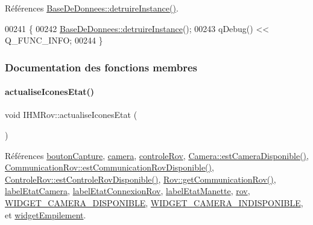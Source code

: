 Références \hyperlink{class_base_de_donnees_a457401c0816b888c77ce915997545f4e}{Base\+De\+Donnees\+::detruire\+Instance()}.


\begin{DoxyCode}
00241 \{
00242     \hyperlink{class_base_de_donnees_a457401c0816b888c77ce915997545f4e}{BaseDeDonnees::detruireInstance}();
00243     qDebug() << Q\_FUNC\_INFO;
00244 \}
\end{DoxyCode}


\subsubsection{Documentation des fonctions membres}
\mbox{\label{class_i_h_m_rov_abbfcdc154a6ae7f941d186f6c90a5a2b}} 
\paragraph{\texorpdfstring{actualise\+Icones\+Etat()}{actualiseIconesEtat()}}
{\footnotesize\ttfamily void I\+H\+M\+Rov\+::actualise\+Icones\+Etat (\begin{DoxyParamCaption}{ }\end{DoxyParamCaption})\hspace{0.3cm}{\ttfamily [private]}}



Références \hyperlink{class_i_h_m_rov_a149c634582225cff29b6c8555eb7ba85}{bouton\+Capture}, \hyperlink{class_i_h_m_rov_a0eda0e4726269508d4563d98064dca9d}{camera}, \hyperlink{class_i_h_m_rov_a405b0c05970829fbf297ee0d26af9bca}{controle\+Rov}, \hyperlink{class_camera_afb73ab859802a143a1a00443e396143e}{Camera\+::est\+Camera\+Disponible()}, \hyperlink{class_communication_rov_a513c26b04745fa2ae31b4533d656dfd4}{Communication\+Rov\+::est\+Communication\+Rov\+Disponible()}, \hyperlink{class_controle_rov_a9531520e50479fc2e339cd43f4c87066}{Controle\+Rov\+::est\+Controle\+Rov\+Disponible()}, \hyperlink{class_rov_ad30543625f584e28bf785a80c59506dc}{Rov\+::get\+Communication\+Rov()}, \hyperlink{class_i_h_m_rov_a2ec8f0e6175a73377e4b7e96b4f29b95}{label\+Etat\+Camera}, \hyperlink{class_i_h_m_rov_a83a10634509cf2d32a0bcee159eecbc3}{label\+Etat\+Connexion\+Rov}, \hyperlink{class_i_h_m_rov_ad62586ec4cef61ef851626515fd0f72a}{label\+Etat\+Manette}, \hyperlink{class_i_h_m_rov_a777ca33fdb295ba6b6773e880356fa1e}{rov}, \hyperlink{ihmrov_8h_a01e28fb5361c4789cfefd3682ad1c25b}{W\+I\+D\+G\+E\+T\+\_\+\+C\+A\+M\+E\+R\+A\+\_\+\+D\+I\+S\+P\+O\+N\+I\+B\+LE}, \hyperlink{ihmrov_8h_a811ff9a6b410f748f13757277a45d1cd}{W\+I\+D\+G\+E\+T\+\_\+\+C\+A\+M\+E\+R\+A\+\_\+\+I\+N\+D\+I\+S\+P\+O\+N\+I\+B\+LE}, et \hyperlink{class_i_h_m_rov_a238e50788d62ae2c34b4ae6c8082d596}{widget\+Empilement}.



